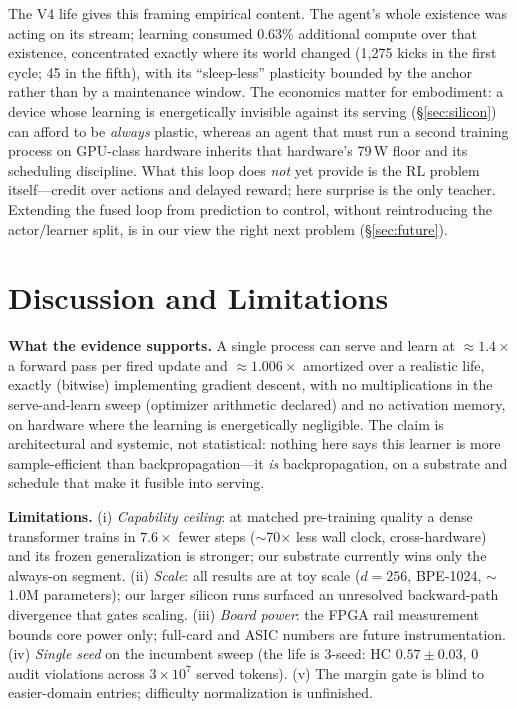 \documentclass{article}
\begin{document}
The V4 life gives this framing empirical content. The agent's whole
existence was acting on its stream; learning consumed 0.63\% additional
compute over that existence, concentrated exactly where its world changed
(1{,}275 kicks in the first cycle; 45 in the fifth), with its ``sleep-less''
plasticity bounded by the anchor rather than by a maintenance window. The
economics matter for embodiment: a device whose learning is energetically
invisible against its serving (\S\ref{sec:silicon}) can afford to be
\emph{always} plastic, whereas an agent that must run a second training
process on GPU-class hardware inherits that hardware's 79\,W floor and its
scheduling discipline. What this loop does \emph{not} yet provide is the RL
problem itself---credit over actions and delayed reward; here surprise is
the only teacher. Extending the fused loop from prediction to control,
without reintroducing the actor/learner split, is in our view the right next
problem (\S\ref{sec:future}).

\section{Discussion and Limitations}
\label{sec:discussion}

\textbf{What the evidence supports.} A single process can serve and learn at
$\approx1.4\times$ a forward pass per fired update and $\approx1.006\times$
amortized over a realistic life, exactly (bitwise) implementing gradient
descent, with no multiplications in the serve-and-learn sweep (optimizer
arithmetic declared) and no activation memory, on hardware where
the learning is energetically negligible. The claim is architectural and
systemic, not statistical: nothing here says this learner is more
sample-efficient than backpropagation---it \emph{is} backpropagation, on a
substrate and schedule that make it fusible into serving.

\textbf{Limitations.} (i) \emph{Capability ceiling}: at matched pre-training
quality a dense transformer trains in $7.6\times$ fewer steps
($\sim$70$\times$ less wall clock, cross-hardware) and its
frozen generalization is stronger; our substrate currently wins only the
always-on segment. (ii) \emph{Scale}: all results are at toy scale ($d{=}256$,
BPE-1024, $\sim$1.0M parameters); our larger silicon runs surfaced an unresolved
backward-path divergence that gates scaling. (iii) \emph{Board power}: the
FPGA rail measurement bounds core power only; full-card and ASIC numbers are
future instrumentation. (iv) \emph{Single seed} on the incumbent sweep
(the life is 3-seed: HC $0.57\pm0.03$, 0 audit violations across $3{\times}10^7$
served tokens). (v) The margin gate is blind to
easier-domain entries; difficulty normalization is unfinished.
\end{document}
